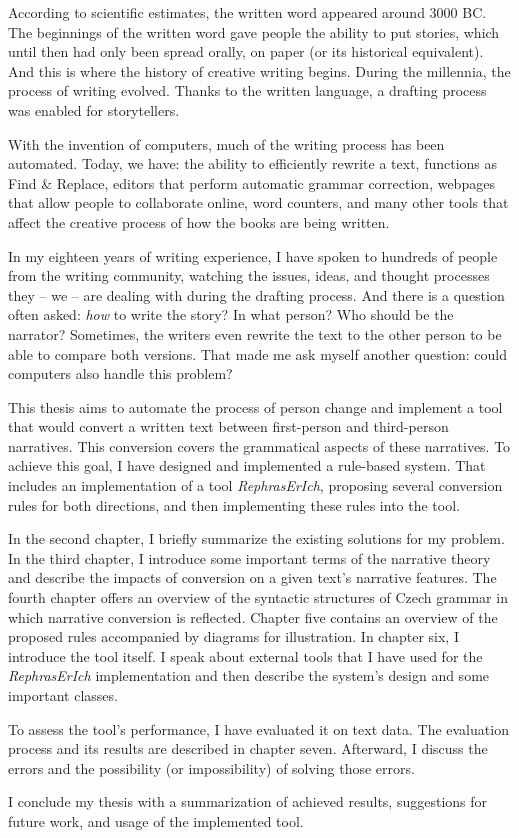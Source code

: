 According to scientific estimates, the written word appeared around 3000 BC. The beginnings of the written word gave people the ability to put stories, which until then had only been spread orally, on paper (or its historical equivalent). And this is where the history of creative writing begins. During the millennia, the process of writing evolved. Thanks to the written language, a drafting process was enabled for storytellers.

With the invention of computers, much of the writing process has been automated. Today, we have: the ability to efficiently rewrite a text, functions as Find \& Replace, editors that perform automatic grammar correction, webpages that allow people to collaborate online, word counters, and many other tools that affect the creative process of how the books are being written.

In my eighteen years of writing experience, I have spoken to hundreds of people from the writing community, watching the issues, ideas, and thought processes they -- we -- are dealing with during the drafting process. And there is a question often asked: \emph{how} to write the story? In what person? Who should be the narrator? Sometimes, the writers even rewrite the text to the other person to be able to compare both versions. That made me ask myself another question: could computers also handle this problem?

This thesis aims to automate the process of person change and implement a tool that would convert a written text between first-person and third-person narratives. This conversion covers the grammatical aspects of these narratives. To achieve this goal, I have designed and implemented a rule-based system. That includes an implementation of a tool \emph{RephrasErIch}, proposing several conversion rules for both directions, and then implementing these rules into the tool.

In the second chapter, I briefly summarize the existing solutions for my problem. In the third chapter, I introduce some important terms of the narrative theory and describe the impacts of conversion on a given text's narrative features. The fourth chapter offers an overview of the syntactic structures of Czech grammar in which narrative conversion is reflected. Chapter five contains an overview of the proposed rules accompanied by diagrams for illustration. In chapter six, I introduce the tool itself. I speak about external tools that I have used for the \emph{RephrasErIch} implementation and then describe the system's design and some important classes.

To assess the tool's performance, I have evaluated it on text data. The evaluation process and its results are described in chapter seven. Afterward, I discuss the errors and the possibility (or impossibility) of solving those errors.

I conclude my thesis with a summarization of achieved results, suggestions for future work, and usage of the implemented tool.

